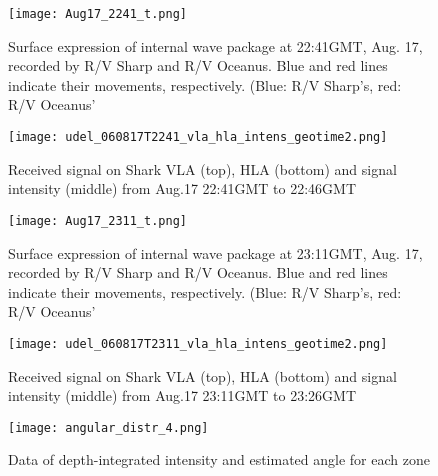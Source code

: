 \begin{figure}[H]
  \centering
  \texttt{[image: Aug17\_2241\_t.png]}
  \caption{Surface expression of internal wave package at 22:41GMT, Aug. 17, recorded by R/V Sharp and R/V Oceanus. Blue and red lines indicate their movements, respectively. (Blue: R/V Sharp's, red: R/V Oceanus'}\label{fig:r2241_r}
\end{figure}


\begin{figure}[H]
  \centering
  \texttt{[image: udel\_060817T2241\_vla\_hla\_intens\_geotime2.png]}
  \caption{Received signal on Shark VLA (top), HLA (bottom) and signal intensity (middle) from Aug.17 22:41GMT to 22:46GMT }\label{fig:a2241}
\end{figure}



\begin{figure}[H]
  \centering
  \texttt{[image: Aug17\_2311\_t.png]}
  \caption{Surface expression of internal wave package at 23:11GMT, Aug. 17, recorded by R/V Sharp and R/V Oceanus. Blue and red lines indicate their movements, respectively. (Blue: R/V Sharp's, red: R/V Oceanus'}\label{fig:r2311_r}
\end{figure}


\begin{figure}[H]
  \centering
  \texttt{[image: udel\_060817T2311\_vla\_hla\_intens\_geotime2.png]}
  \caption{Received signal on Shark VLA (top), HLA (bottom) and signal intensity (middle) from Aug.17 23:11GMT to 23:26GMT }\label{fig:a2311}
\end{figure}



\clearpage


\begin{figure}[H]
  \centering
  \texttt{[image: angular\_distr\_4.png]}
  \caption{Data of depth-integrated intensity and estimated angle for each zone }\label{fig:a2130}
\end{figure}

